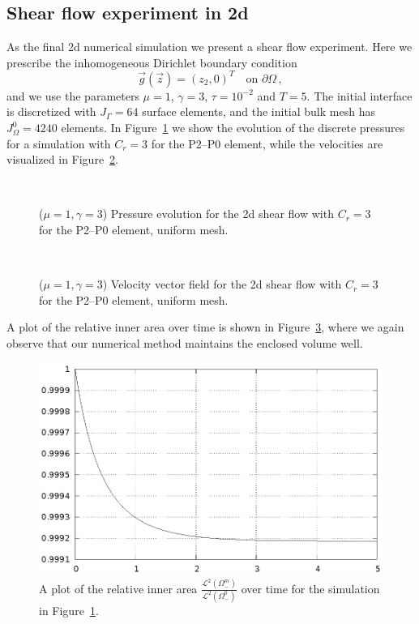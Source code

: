 \subsection{Shear flow experiment in 2d}
As the final 2d numerical simulation we present a shear flow experiment. Here
we prescribe the inhomogeneous Dirichlet boundary condition
\begin{equation*}
\vec g(\vec z)=(z_2,0)^T\quad \mbox{on }\partial\Omega\,,
\end{equation*}
and we use the parameters $\mu=1$, $\gamma=3$, $\tau=10^{-2}$ and $T=5$.
The initial interface is discretized with $J_\Gamma = 64$ surface elements,
and the initial bulk mesh has $J_\Omega^0 = 4240$ elements. In
Figure~\ref{fig:shear_2d} we show the evolution of the discrete pressures
for a simulation with $C_r=3$ for the P2--P0 element, while the velocities
are visualized in Figure~\ref{fig:shear_2d_velocity}.
\begin{figure}[htbp]
\centering
{}
\\
\caption[Stokes 2d shear flow pressure]
{($\mu=1,\gamma=3$) Pressure evolution for the 2d shear flow with $C_r=3$ for
the P2--P0 element, uniform mesh.}
\label{fig:shear_2d}
\end{figure}
\begin{figure}[htbp]
\centering
{}
\\
\caption[Stokes 2d shear flow velocity]
{($\mu=1,\gamma=3$) Velocity vector field for the 2d shear flow with $C_r=3$
for the P2--P0 element, uniform mesh.}
\label{fig:shear_2d_velocity}
\end{figure}

A plot of the relative inner area over time is shown in
Figure~\ref{fig:shear_2d_bulk_inner_volume}, where we again observe that our
numerical method maintains the enclosed volume well.
\begin{figure}[htbp]
\centering
\includegraphics[width=.45\textwidth]
{figures/stokes/2d_shear_bulk_inner_volume.ps}
\caption[Stokes 2d shear flow inner area]
{A plot of the relative inner area
$\frac{\mathcal{L}^2(\Omega^m_-)}{\mathcal{L}^2(\Omega^0_-)}$
over time for the simulation in Figure~\ref{fig:shear_2d}.}
\label{fig:shear_2d_bulk_inner_volume}
\end{figure}

